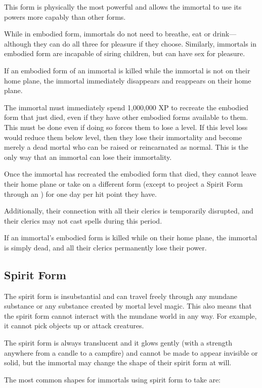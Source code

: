 \begin{multicols*}{2}
This form is physically the most powerful and allows the immortal to use its powers more capably than other forms.

While in embodied form, immortals do not need to breathe, eat or drink—although they can do all three for pleasure if they choose. Similarly, immortals in embodied form are incapable of siring children, but can have sex for pleasure.

If an embodied form of an immortal is killed while the immortal is not on their home plane, the immortal immediately disappears and reappears on their home plane.

The immortal must immediately spend 1,000,000 XP to recreate the embodied form that just died, even if they have other embodied forms available to them. This must be done even if doing so forces them to lose a level. If this level loss would reduce them below  level, then they lose their immortality and become merely a dead mortal who can be raised or reincarnated as normal. This is the only way that an immortal can lose their immortality.

Once the immortal has recreated the embodied form that died, they cannot leave their home plane or take on a different form (except to project a Spirit Form through an ) for one day per hit point they have.

Additionally, their connection with all their clerics is temporarily disrupted, and their clerics may not cast spells during this period.

If an immortal’s embodied form is killed while on their home plane, the immortal is simply dead, and all their clerics permanently lose their power.

\subsection{Spirit Form}
The spirit form is insubstantial and can travel freely through any mundane substance or any substance created by mortal level magic. This also means that the spirit form cannot interact with the mundane world in any way. For example, it cannot pick objects up or attack creatures.

The spirit form is always translucent and it glows gently (with a strength anywhere from a candle to a campfire) and cannot be made to appear invisible or solid, but the immortal may change the shape of their spirit form at will.

The most common shapes for immortals using spirit form to take are:


\end{multicols*}
